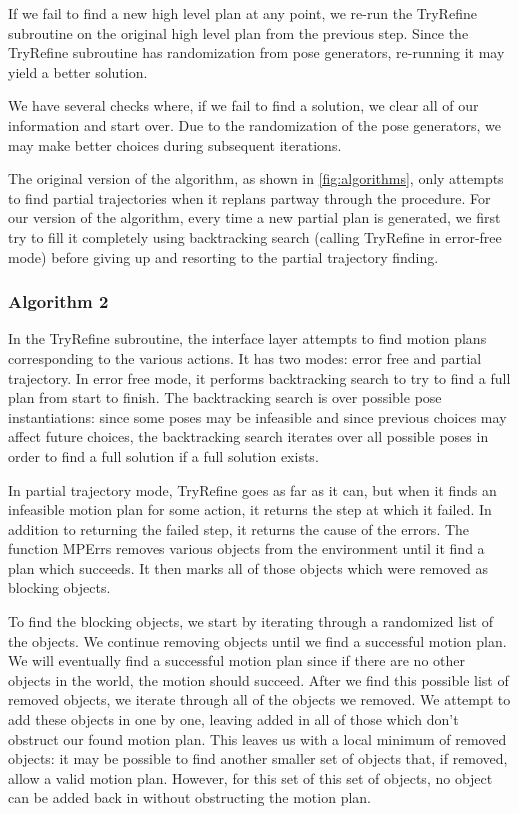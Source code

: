 \documentclass[12pt]{article}
\begin{document}
If we fail to find a new high level plan at any point, we re-run the TryRefine subroutine on the original high level plan from the previous step.  
Since the TryRefine subroutine has randomization from pose generators, re-running it may yield a better solution. 

We have several checks where, if we fail to find a solution, we clear all of our information and start over.  Due to the randomization of the pose generators, we may make better choices during subsequent iterations.  

The original version of the algorithm, as shown in \ref{fig:algorithms}, only attempts to find partial trajectories when it replans partway through the procedure.  For our version of the algorithm, every time a new partial plan is generated, we first try to fill it completely using backtracking search (calling TryRefine in error-free mode) before giving up and resorting to the partial trajectory finding.  

\subsubsection{Algorithm 2}


In the TryRefine subroutine, the interface layer attempts to find motion plans corresponding to the various actions.  
It has two modes: error free and partial trajectory.  
In error free mode, it performs backtracking search to try to find a full plan from start to finish.  
The backtracking search is over possible pose instantiations: since some poses may be infeasible and since previous choices may affect future choices, the backtracking search iterates over all possible poses in order to find a full solution if a full solution exists.  

In partial trajectory mode, TryRefine goes as far as it can, but when it finds an infeasible motion plan for some action, it returns the step at which it failed.  
In addition to returning the failed step, it returns the cause of the errors.  
The function MPErrs removes various objects from the environment until it find a plan which succeeds.  
It then marks all of those objects which were removed as blocking objects.

To find the blocking objects, we start by iterating through a randomized list of the objects.  We continue removing objects until we find a successful motion plan.  
We will eventually find a successful motion plan since if there are no other objects in the world, the motion should succeed.  
After we find this possible list of removed objects, we iterate through all of the objects we removed.  
We attempt to add these objects in one by one, leaving added in all of those which don't obstruct our found motion plan.  
This leaves us with a local minimum of removed objects: it may be possible to find another smaller set of objects that, if removed, allow a valid motion plan.  
However, for this set of this set of objects, no object can be added back in without obstructing the motion plan.
\end{document}
